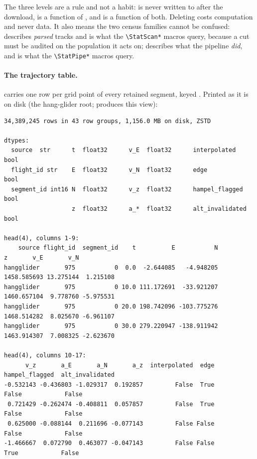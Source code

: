 \begin{revblock}
The three levels are a rule and not a habit:  is never written to after the
download,  is a function of , and  is a function
of both. Deleting  costs computation and never data. It also means the two
census families cannot be confused:  describes \emph{parsed}
tracks and is what the \texttt{\textbackslash StatScan*} macros query, because a cut must
be audited on the population it acts on;  describes what the
pipeline \emph{did}, and is what the \texttt{\textbackslash StatPipe*} macros query.

\paragraph{The trajectory table.}  carries one row per grid point of
every retained segment, keyed . Printed as it is on
disk (the hang-glider root;  produces this view):

{\footnotesize
\begin{verbatim}
34,389,245 rows in 43 row groups, 1,156.0 MB on disk, ZSTD

dtypes:
  source  str      t  float32      v_E  float32      interpolated     bool
  flight_id str    E  float32      v_N  float32      edge             bool
  segment_id int16 N  float32      v_z  float32      hampel_flagged   bool
                   z  float32      a_*  float32      alt_invalidated  bool

head(4), columns 1-9:
    source flight_id  segment_id    t          E           N           z       v_E       v_N
hangglider       975           0  0.0  -2.644085   -4.948205 1458.585693 13.275144  1.215108
hangglider       975           0 10.0 111.172691  -33.921207 1460.657104  9.778760 -5.975531
hangglider       975           0 20.0 198.742096 -103.775276 1468.514282  8.025670 -6.961107
hangglider       975           0 30.0 279.220947 -138.911942 1463.914307  7.008325 -2.623670

head(4), columns 10-17:
      v_z       a_E       a_N       a_z  interpolated  edge  hampel_flagged  alt_invalidated
-0.532143 -0.436803 -1.029317  0.192857         False  True           False            False
 0.721429 -0.262474 -0.408811  0.057857         False  True           False            False
 0.625000 -0.088144  0.211696 -0.077143         False False           False            False
-1.466667  0.072790  0.463077 -0.047143         False False            True            False
\end{verbatim}
}


\end{revblock}
